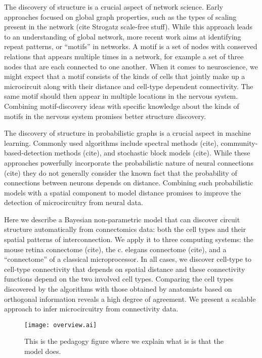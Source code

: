\documentclass{nature}
\begin{document}
The discovery of structure is a crucial aspect of network
science. Early approaches focused on global graph properties, such as
the types of scaling present in the network (cite Strogatz scale-free
stuff).  While this approach leads to an understanding of global
network, more recent work aims at identifying repeat patterns, or
“motifs” in networks. A motif is a set of nodes with conserved
relations that appears multiple times in a network, for example a set
of three nodes that are each connected to one another. When it comes
to neuroscience, we might expect that a motif consists of the kinds of
cells that jointly make up a microcircuit along with their distance
and cell-type dependent connectivity. The same motif should then
appear in multiple locations in the nervous system. Combining
motif-discovery ideas with specific knowledge about the kinds of
motifs in the nervous system promises better structure discovery.

The discovery of structure in probabilistic graphs is a crucial aspect
in machine learning. Commonly used algorithms include spectral methods
(cite), community-based-detection methods (cite), and stochastic block
models (cite). While these approaches powerfully incorporate the
probabilistic nature of neural connections (cite) they do not
generally consider the known fact that the probability of connections
between neurons depends on distance. Combining such probabilistic
models with a spatial component to model distance promises to improve
the detection of microcircuitry from neural data.

Here we describe a Bayesian non-parametric model that can discover
circuit structure automatically from connectomics data: both the cell
types and their spatial patterns of interconnection. We apply it to
three computing systems: the mouse retina connectome (cite), the
c. elegans connectome (cite), and a ``connectome'' of a classical
microprocessor. In all cases, we discover cell-type to cell-type
connectivity that depends on spatial distance and these connectivity
functions depend on the two involved cell types. Comparing the cell
types discovered by the algorithms with those obtained by anatomists
based on orthogonal information reveals a high degree of agreement. We
present a scalable approach to infer microcircuitry from connectivity
data.

\begin{figure}
  \centering 
  \centerline{\texttt{[image: overview.ai]}}
  \caption{This is the pedagogy figure where we explain what is is
    that the model does. }
\end{figure}
\end{document}
